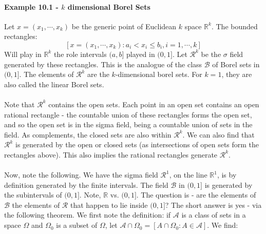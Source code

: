 \documentclass[12pt,a4paper]{article}
\newcommand{\1}[1]{\mathbbm{1}\left\{ #1 \right\}}
\newcommand{\R}{\mathbb{R}}
\newcommand{\acal}{\mathcal{A}}
\newcommand{\bcal}{\mathcal{B}}
\newcommand{\rcal}{\mathcal{R}}
\begin{document}
\paragraph{Example 10.1 - $k$ dimensional Borel Sets} Let $x = (x_1, \cdots ,x_k)$ be the generic point of Euclidean $k$ space $\R^k$. The bounded rectangles:
$$
	\left[x = (x_1, \cdots, x_k) : a_i < x_i \leq b_i, i = 1, \cdots, k\right]
$$
Will play in $\R^k$ the role intervals $(a,b]$ played in $(0,1]$. Let $\rcal^k$ be the $\sigma$ field generated by these rectangles. This is the analogue of the class $\bcal$ of Borel sets in $(0,1]$. The elements of $\rcal^k$ are the $k$-dimensional borel sets. For $k=1$, they are also called the linear Borel sets.
\\\\
Note that $\rcal^k$ contains the open sets. Each point in an open set contains an open rational rectangle - the countable union of these rectangles forms the open set, and so the open set is in the sigma field, being a countable union of sets in the field. As complements, the closed sets are also within $\rcal^k$. We can also find that $\rcal^k$ is generated by the open or closed sets (as intersections of open sets form the rectangles above). This also implies the rational rectangles generate $\rcal^k$. 
\\\\
Now, note the following. We have the sigma field $\rcal^1$, on the line $\R^1$, is by definition generated by the finite intervals. The field $\bcal$ in $(0,1]$ is generated by the subintervals of $(0,1]$. Note, $\R$ vs. $(0,1]$. The question is - are the elements of $\bcal$ the elements of $\rcal$ that happen to lie inside $(0,1]$? The short answer is yes - via the following theorem. We first note the definition: if $\acal$ is a class of sets in a space $\Omega$ and $\Omega_0$ is a subset of $\Omega$, let $\acal \cap \Omega_0 = \left[A \cap \Omega_0 : A \in \acal\right]$. We find:
\end{document}
